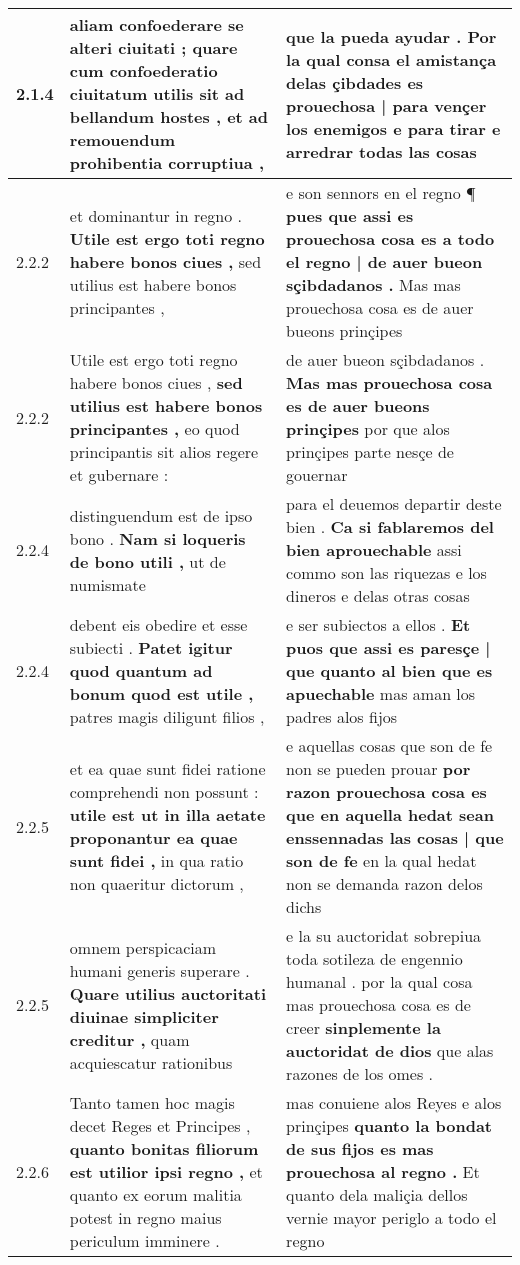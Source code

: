 \begin{tabular}{|p{1cm}|p{6.5cm}|p{6.5cm}|}
2.1.4 & aliam confoederare se alteri ciuitati ; \textbf{ quare cum confoederatio ciuitatum utilis sit ad bellandum hostes , } et ad remouendum prohibentia corruptiua , & que la pueda ayudar . \textbf{ Por la qual consa el amistança delas çibdades es prouechosa | para vençer los enemigos } e para tirar e arredrar todas las cosas \\\hline
2.2.2 & et dominantur in regno . \textbf{ Utile est ergo toti regno habere bonos ciues , } sed utilius est habere bonos principantes , & e son sennors en el regno ¶ \textbf{ pues que assi es prouechosa cosa es a todo el regno | de auer bueon sçibdadanos . } Mas mas prouechosa cosa es de auer bueons prinçipes \\\hline
2.2.2 & Utile est ergo toti regno habere bonos ciues , \textbf{ sed utilius est habere bonos principantes , } eo quod principantis sit alios regere et gubernare : & de auer bueon sçibdadanos . \textbf{ Mas mas prouechosa cosa es de auer bueons prinçipes } por que alos prinçipes parte nesçe de gouernar \\\hline
2.2.4 & distinguendum est de ipso bono . \textbf{ Nam si loqueris de bono utili , } ut de numismate & para el deuemos departir deste bien . \textbf{ Ca si fablaremos del bien aprouechable } assi commo son las riquezas e los dineros e delas otras cosas \\\hline
2.2.4 & debent eis obedire et esse subiecti . \textbf{ Patet igitur quod quantum ad bonum quod est utile , } patres magis diligunt filios , & e ser subiectos a ellos . \textbf{ Et puos que assi es paresçe | que quanto al bien que es apuechable } mas aman los padres alos fijos \\\hline
2.2.5 & et ea quae sunt fidei ratione comprehendi non possunt : \textbf{ utile est ut in illa aetate proponantur ea quae sunt fidei , } in qua ratio non quaeritur dictorum , & e aquellas cosas que son de fe non se pueden prouar \textbf{ por razon prouechosa cosa es que en aquella hedat sean enssennadas las cosas | que son de fe } en la qual hedat non se demanda razon delos dichs \\\hline
2.2.5 & omnem perspicaciam humani generis superare . \textbf{ Quare utilius auctoritati diuinae simpliciter creditur , } quam acquiescatur rationibus & e la su auctoridat sobrepiua toda sotileza de engennio humanal . por la qual cosa mas prouechosa cosa es de creer \textbf{ sinplemente la auctoridat de dios } que alas razones de los omes . \\\hline
2.2.6 & Tanto tamen hoc magis decet Reges et Principes , \textbf{ quanto bonitas filiorum est utilior ipsi regno , } et quanto ex eorum malitia potest in regno maius periculum imminere . & mas conuiene alos Reyes e alos prinçipes \textbf{ quanto la bondat de sus fijos es mas prouechosa al regno . } Et quanto dela maliçia dellos vernie mayor periglo a todo el regno \\\hline

\end{tabular}
